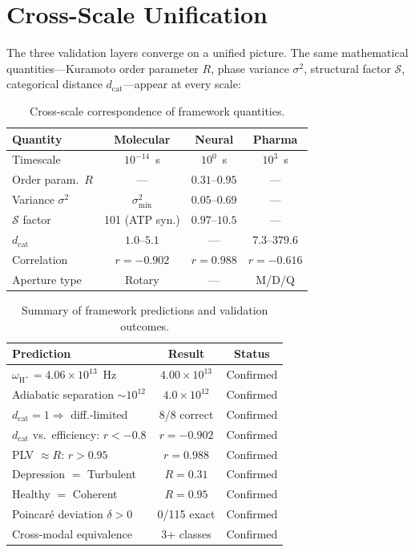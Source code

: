 \documentclass[twocolumn,10pt]{article}
\newcommand{\dcat}{d_{\mathrm{cat}}}
\newcommand{\Hplus}{\mathrm{H}^{+}}
\newcommand{\Rorder}{R}
\begin{document}
\section{Cross-Scale Unification}
\label{sec:cross}

The three validation layers converge on a unified picture.  The same mathematical quantities---Kuramoto order parameter $\Rorder$, phase variance $\sigma^{2}$, structural factor $\mathcal{S}$, categorical distance $\dcat$---appear at every scale:

\begin{table}[t]
\centering
\caption{Cross-scale correspondence of framework quantities.}
\label{tab:cross_scale}
\small
\begin{tabular}{@{}lccc@{}}
\toprule
Quantity & Molecular & Neural & Pharma \\
\midrule
Timescale & $10^{-14}$~s & $10^{0}$~s & $10^{3}$~s \\
Order param.\ $\Rorder$ & --- & $0.31$--$0.95$ & --- \\
Variance $\sigma^{2}$ & $\sigma^{2}_{\min}$ & $0.05$--$0.69$ & --- \\
$\mathcal{S}$ factor & 101 (ATP syn.) & $0.97$--$10.5$ & ---  \\
$\dcat$ & $1.0$--$5.1$ & --- & $7.3$--$379.6$ \\
Correlation & $r = -0.902$ & $r = 0.988$ & $r = -0.616$ \\
Aperture type & Rotary & --- & M/D/Q \\
\bottomrule
\end{tabular}
\end{table}

\begin{table}[t]
\centering
\caption{Summary of framework predictions and validation outcomes.}
\label{tab:predictions}
\small
\begin{tabular}{@{}p{4.2cm}cc@{}}
\toprule
Prediction & Result & Status \\
\midrule
$\omega_{\Hplus} = 4.06 \times 10^{13}$~Hz & $4.00 \times 10^{13}$ & Confirmed \\
Adiabatic separation $\sim 10^{12}$ & $4.0 \times 10^{12}$ & Confirmed \\
$\dcat = 1 \Rightarrow$ diff.-limited & 8/8 correct & Confirmed \\
$\dcat$ vs.\ efficiency: $r < -0.8$ & $r = -0.902$ & Confirmed \\
PLV $\approx \Rorder$: $r > 0.95$ & $r = 0.988$ & Confirmed \\
Depression $= $ Turbulent & $\Rorder = 0.31$ & Confirmed \\
Healthy $= $ Coherent & $\Rorder = 0.95$ & Confirmed \\
Poincar\'e deviation $\delta > 0$ & 0/115 exact & Confirmed \\
Cross-modal equivalence & 3+ classes & Confirmed \\
\bottomrule
\end{tabular}
\end{table}
\end{document}
